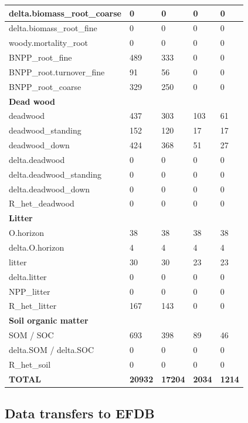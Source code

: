 \documentclass[, manuscript]{copernicus}
\begin{document}
\begin{longtable}[t]{l|l|l|l|l}
\hline
delta.biomass\_root\_coarse & 0 & 0 & 0 & 0\\
\hline
delta.biomass\_root\_fine & 0 & 0 & 0 & 0\\
\hline
woody.mortality\_root & 0 & 0 & 0 & 0\\
\hline
BNPP\_root\_fine & 489 & 333 & 0 & 0\\
\hline
BNPP\_root.turnover\_fine & 91 & 56 & 0 & 0\\
\hline
BNPP\_root\_coarse & 329 & 250 & 0 & 0\\
\hline
\textbf{Dead wood} & \textbf{} & \textbf{} & \textbf{} & \textbf{}\\
\hline
deadwood & 437 & 303 & 103 & 61\\
\hline
deadwood\_standing & 152 & 120 & 17 & 17\\
\hline
deadwood\_down & 424 & 368 & 51 & 27\\
\hline
delta.deadwood & 0 & 0 & 0 & 0\\
\hline
delta.deadwood\_standing & 0 & 0 & 0 & 0\\
\hline
delta.deadwood\_down & 0 & 0 & 0 & 0\\
\hline
R\_het\_deadwood & 0 & 0 & 0 & 0\\
\hline
\textbf{Litter} & \textbf{} & \textbf{} & \textbf{} & \textbf{}\\
\hline
O.horizon & 38 & 38 & 38 & 38\\
\hline
delta.O.horizon & 4 & 4 & 4 & 4\\
\hline
litter & 30 & 30 & 23 & 23\\
\hline
delta.litter & 0 & 0 & 0 & 0\\
\hline
NPP\_litter & 0 & 0 & 0 & 0\\
\hline
R\_het\_litter & 167 & 143 & 0 & 0\\
\hline
\textbf{Soil organic matter} & \textbf{} & \textbf{} & \textbf{} & \textbf{}\\
\hline
SOM / SOC & 693 & 398 & 89 & 46\\
\hline
delta.SOM / delta.SOC & 0 & 0 & 0 & 0\\
\hline
R\_het\_soil & 0 & 0 & 0 & 0\\
\hline
\textbf{TOTAL} & \textbf{20932} & \textbf{17204} & \textbf{2034} & \textbf{1214}\\
\hline
\end{longtable}
\endgroup{}

\subsection{Data transfers to EFDB}
\end{document}
